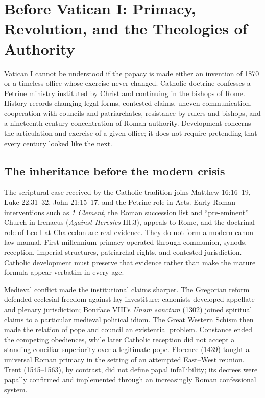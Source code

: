 \section{Before Vatican I: Primacy, Revolution, and the Theologies of Authority}

Vatican I cannot be understood if the papacy is made either an invention of 1870 or a timeless office whose exercise never changed. Catholic doctrine confesses a Petrine ministry instituted by Christ and continuing in the bishops of Rome. History records changing legal forms, contested claims, uneven communication, cooperation with councils and patriarchates, resistance by rulers and bishops, and a nineteenth-century concentration of Roman authority. Development concerns the articulation and exercise of a given office; it does not require pretending that every century looked like the next.

\subsection{The inheritance before the modern crisis}

The scriptural case received by the Catholic tradition joins Matthew 16:16--19, Luke 22:31--32, John 21:15--17, and the Petrine role in Acts. Early Roman interventions such as \emph{1 Clement}, the Roman succession list and “pre-eminent” Church in Irenaeus (\emph{Against Heresies} III.3), appeals to Rome, and the doctrinal role of Leo I at Chalcedon are real evidence. They do not form a modern canon-law manual. First-millennium primacy operated through communion, synods, reception, imperial structures, patriarchal rights, and contested jurisdiction. Catholic development must preserve that evidence rather than make the mature formula appear verbatim in every age.

Medieval conflict made the institutional claims sharper. The Gregorian reform defended ecclesial freedom against lay investiture; canonists developed appellate and plenary jurisdiction; Boniface VIII's \emph{Unam sanctam} (1302) joined spiritual claims to a particular medieval political idiom. The Great Western Schism then made the relation of pope and council an existential problem. Constance ended the competing obediences, while later Catholic reception did not accept a standing conciliar superiority over a legitimate pope. Florence (1439) taught a universal Roman primacy in the setting of an attempted East--West reunion. Trent (1545--1563), by contrast, did not define papal infallibility; its decrees were papally confirmed and implemented through an increasingly Roman confessional system.

